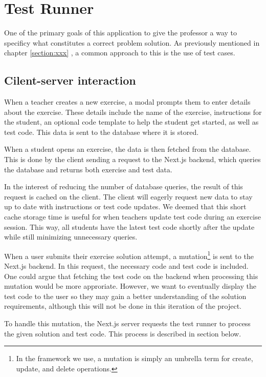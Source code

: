\chapter{Test Runner} \label{chap:TestRunner}
One of the primary goals of this application to give the professor a way to specificy what constitutes a correct problem solution.
As previously mentioned in chapter \ref{section:xxx} , a common approach to this is the use of test cases.

\section{Cilent-server interaction}
When a teacher creates a new exercise, a modal prompts them to enter details about the exercise.
These details include the name of the exercise, instructions for the student, an optional code template to help the student get started, as well as test code.
This data is sent to the database where it is stored.

When a student opens an exercise, the data is then fetched from the database.
This is done by the client sending a request to the Next.js backend, which queries the database and returns both exercise and test data.

In the interest of reducing the number of database queries, the result of this request is cached on the client. 
The client will eagerly request new data to stay up to date with instructions or test code updates.
We deemed that this short cache storage time is useful for when teachers update test code during an exercise session.
This way, all students have the latest test code shortly after the update while still minimizing unnecessary queries.

When a user submits their exercise solution attempt, a mutation\footnote{In the framework we use, a mutation is simply an umbrella term for create, update, and delete operations.} is sent to the Next.js backend.
In this request, the necessary code and test code is included. 
One could argue that fetching the test code on the backend when processing this mutation would be more approriate.
However, we want to eventually display the test code to the user so they may gain a better understanding of the solution requirements, although this will not be done in this iteration of the project.

To handle this mutation, the Next.js server requests the test runner to process the given solution and test code.
This process is described in section \label{sec:test_runner_process} below.
 
